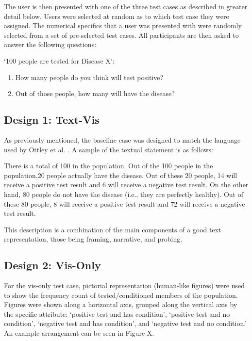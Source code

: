 The user is then presented with one of the three test cases as described in greater detail below. Users were selected at random as to which test case they were assigned. The numerical specifics that a user was presented with were randomly selected from a set of pre-selected test cases. All participants are then asked to answer the following questions:

‘100 people are tested for Disease X’:
\begin{enumerate}
    \item How many people do you think will test positive?
    \item Out of those people, how many will have the disease? 
\end{enumerate}

\subsection{Design 1: Text-Vis}
As previously mentioned, the baseline case was designed to match the language used by Ottley et al. \cite{Ottley2016}. A sample of the textual statement is as follows:

\begin{displayquote}
    There is a total of 100 in the population. Out of the 100 people in the population,20 people actually have the disease. Out of these 20 people, 14 will receive a positive test result and 6 will receive a negative test result. On the other hand, 80 people do not have the disease (i.e., they are perfectly healthy). Out of these 80 people, 8 will receive a positive test result and 72 will receive a negative test result.
\end{displayquote}

This description is a combination of the main components of a good text representation, those being framing, narrative, and probing.

\subsection{Design 2: Vis-Only}
For the vis-only test case, pictorial representation (human-like figures) were used to show the frequency count of tested/conditioned members of the population. Figures were shown along a horizontal axis, grouped along the vertical axis by the specific attribute: ‘positive test and has condition’, ‘positive test and no condition’, ‘negative test and has condition’, and ‘negative test and no condition.’ An example arrangement can be seen in Figure X. 

